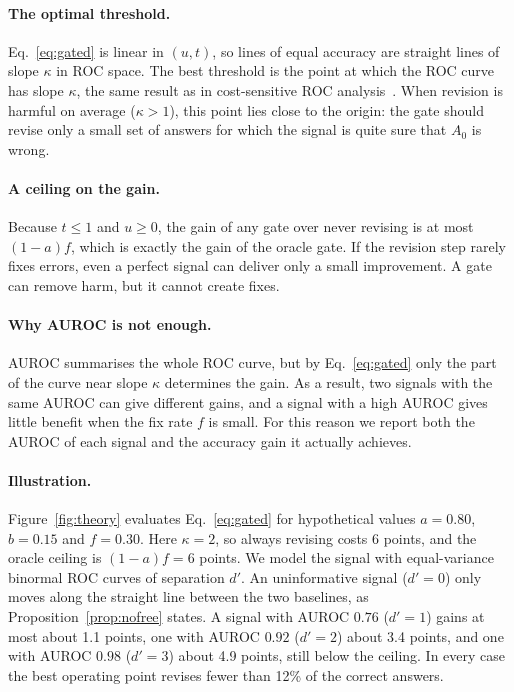 \paragraph{The optimal threshold.} Eq.~\eqref{eq:gated} is linear in $(u,t)$, so lines of equal accuracy are straight lines of slope $\kappa$ in ROC space. The best threshold is the point at which the ROC curve has slope $\kappa$, the same result as in cost-sensitive ROC analysis~\cite{fawcett2006roc}. When revision is harmful on average ($\kappa>1$), this point lies close to the origin: the gate should revise only a small set of answers for which the signal is quite sure that $A_0$ is wrong.

\paragraph{A ceiling on the gain.} Because $t\le 1$ and $u\ge 0$, the gain of any gate over never revising is at most $(1-a)f$, which is exactly the gain of the oracle gate. If the revision step rarely fixes errors, even a perfect signal can deliver only a small improvement. A gate can remove harm, but it cannot create fixes.

\paragraph{Why AUROC is not enough.} AUROC summarises the whole ROC curve, but by Eq.~\eqref{eq:gated} only the part of the curve near slope $\kappa$ determines the gain. As a result, two signals with the same AUROC can give different gains, and a signal with a high AUROC gives little benefit when the fix rate $f$ is small. For this reason we report both the AUROC of each signal and the accuracy gain it actually achieves.

\paragraph{Illustration.} Figure~\ref{fig:theory} evaluates Eq.~\eqref{eq:gated} for hypothetical values $a=0.80$, $b=0.15$ and $f=0.30$. Here $\kappa=2$, so always revising costs 6 points, and the oracle ceiling is $(1-a)f=6$ points. We model the signal with equal-variance binormal ROC curves of separation $d'$. An uninformative signal ($d'=0$) only moves along the straight line between the two baselines, as Proposition~\ref{prop:nofree} states. A signal with AUROC $0.76$ ($d'=1$) gains at most about 1.1 points, one with AUROC $0.92$ ($d'=2$) about 3.4 points, and one with AUROC $0.98$ ($d'=3$) about 4.9 points, still below the ceiling. In every case the best operating point revises fewer than 12\% of the correct answers.

